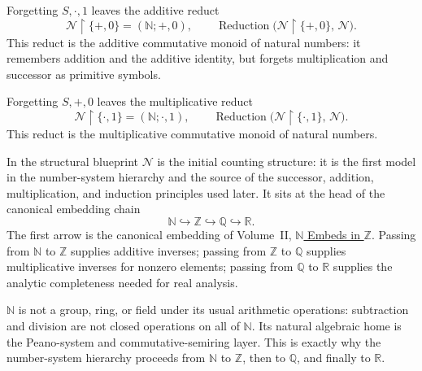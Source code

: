 \begin{remark*}
Forgetting $S,\cdot,1$ leaves the additive reduct
\[
\mathcal{N}\!\restriction\!\{+,0\}
=
(\mathbb{N};+,0),
\qquad
\operatorname{Reduction}\!\bigl(\mathcal{N}\!\restriction\!\{+,0\},\,\mathcal{N}\bigr).
\]
This reduct is the additive commutative monoid of natural numbers: it remembers
addition and the additive identity, but forgets multiplication and successor as
primitive symbols.
\end{remark*}

\begin{remark*}
Forgetting $S,+,0$ leaves the multiplicative reduct
\[
\mathcal{N}\!\restriction\!\{\cdot,1\}
=
(\mathbb{N};\cdot,1),
\qquad
\operatorname{Reduction}\!\bigl(\mathcal{N}\!\restriction\!\{\cdot,1\},\,\mathcal{N}\bigr).
\]
This reduct is the multiplicative commutative monoid of natural numbers.
\end{remark*}

\begin{remark*}
In the structural blueprint $\mathcal{N}$ is the initial counting structure: it is
the first model in the number-system hierarchy and the source of the successor,
addition, multiplication, and induction principles used later. It sits at the head
of the canonical embedding chain
\[
\mathbb{N}\hookrightarrow\mathbb{Z}\hookrightarrow\mathbb{Q}\hookrightarrow\mathbb{R}.
\]
The first arrow is the canonical embedding of Volume~II,
\hyperref[thm:n-embeds-in-z]{$\mathbb{N}$ Embeds in $\mathbb{Z}$}. Passing
from $\mathbb{N}$ to $\mathbb{Z}$ supplies additive inverses; passing from
$\mathbb{Z}$ to $\mathbb{Q}$ supplies multiplicative inverses for nonzero
elements; passing from $\mathbb{Q}$ to $\mathbb{R}$ supplies the analytic
completeness needed for real analysis.
\end{remark*}

\begin{remark*}[Interpretation]
$\mathbb{N}$ is not a group, ring, or field under its usual arithmetic operations:
subtraction and division are not closed operations on all of $\mathbb{N}$. Its
natural algebraic home is the Peano-system and commutative-semiring layer.
This is exactly why the number-system hierarchy proceeds from
$\mathbb{N}$ to $\mathbb{Z}$, then to $\mathbb{Q}$, and finally to
$\mathbb{R}$.
\end{remark*}

